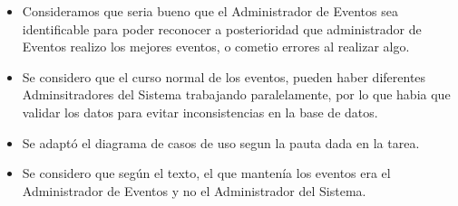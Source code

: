 \begin{itemize}
	\item Consideramos que seria bueno que el Administrador de Eventos sea identificable para poder reconocer a posterioridad que administrador de Eventos realizo los mejores eventos, o cometio errores al realizar algo.
	\item Se considero que el curso normal de los eventos, pueden haber diferentes Adminsitradores del Sistema trabajando paralelamente, por lo que habia que validar los datos para evitar inconsistencias en la base de datos.
	\item Se adapt\'o el diagrama de casos de uso segun la pauta dada en la tarea.
	\item Se considero que seg\'un el texto, el que manten\'ia los eventos era el Administrador de Eventos y no el Administrador del Sistema.
\end{itemize}
